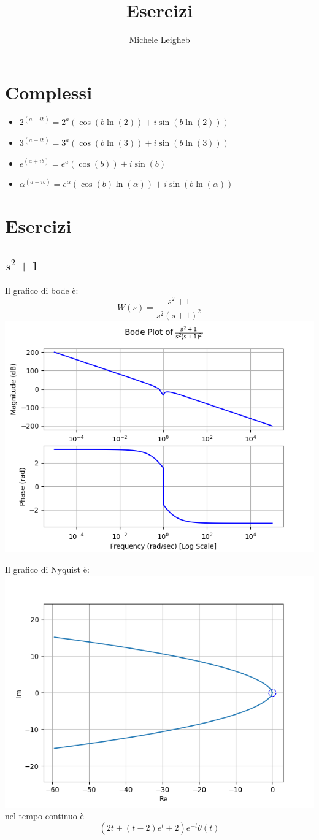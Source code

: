 \documentclass{article}
\title{Esercizi}
\author{Michele Leigheb}
\date{}
\begin{document}
\maketitle
\tableofcontents{}
\section{Complessi}
\begin{itemize}
	\item \(\displaystyle 2^{(a+ib)} = 2^a (\cos(b \ln(2)) + i\sin(b \ln(2))) \)
	\item \(\displaystyle 3^{(a+ib)} = 3^a (\cos(b \ln(3)) + i\sin(b \ln(3))) \)
	\item \(\displaystyle e^{(a+ib)} = e^a (\cos(b)) + i\sin(b) \)
	\item \(\displaystyle \alpha^{(a+ib)} = e^{\alpha} (\cos(b)\ln(\alpha)) + i\sin(b\ln(\alpha)) \)
\end{itemize}



\section{Esercizi}

\subsection{$ s^{2} + 1 $}
Il grafico di bode è:
\[ W(s) = \frac{s^{2} + 1}{s^{2} \left(s + 1\right)^{2}} \]\includegraphics[scale = 0.5]{figures/bode_2948953.png}


Il grafico di Nyquist è:
\includegraphics[scale = 0.5]{figures/nyquist_1238369.png}nel tempo continuo è \[ \left(2 t + \left(t - 2\right) e^{t} + 2\right) e^{- t} \theta\left(t\right) \]
\end{document}
